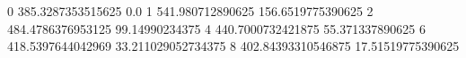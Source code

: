 0 385.3287353515625 0.0
1 541.980712890625 156.6519775390625
2 484.4786376953125 99.14990234375
4 440.7000732421875 55.371337890625
6 418.5397644042969 33.211029052734375
8 402.84393310546875 17.51519775390625
